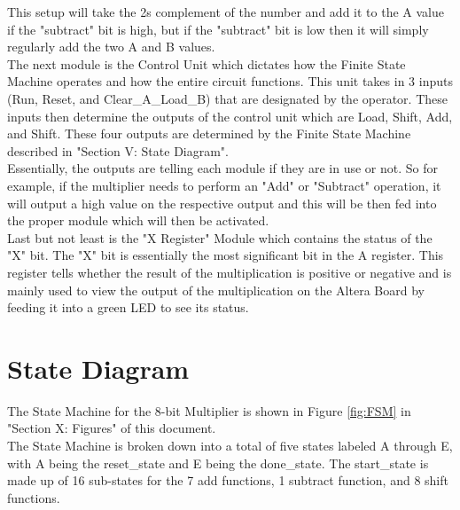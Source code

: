 \documentclass[journal, twocolumn, final,11pt,letterpaper]{IEEEtran}
\begin{document}
This setup will take the 2s complement of the number and add it to the A value if the "subtract" bit is high, but if the "subtract" bit is low then it will simply regularly add the two A and B values. \\

The next module is the Control Unit which dictates how the Finite State Machine operates and how the entire circuit functions. This unit takes in 3 inputs (Run, Reset, and Clear\_A\_Load\_B) that are designated by the operator. These inputs then determine the outputs of the control unit which are Load, Shift, Add, and Shift. These four outputs are determined by the Finite State Machine described in "Section V: State Diagram".\\

 Essentially, the outputs are telling each module if they are in use or not. So for example, if the multiplier needs to perform an "Add" or "Subtract" operation, it will output a high value on the respective output and this will be then fed into the proper module which will then be activated. \\

Last but not least is the "X Register" Module which contains the status of the "X" bit. The "X" bit is essentially the most significant bit in the A register. This register tells whether the result of the multiplication is positive or negative and is mainly used to view the output of the multiplication on the Altera Board by feeding it into a green LED to see its status. 

\section{State Diagram}
The State Machine for the 8-bit Multiplier is shown in Figure \ref{fig:FSM} in "Section X: Figures" of this document.  \\

The State Machine is broken down into a total of five states labeled A through E, with A being the reset\_state and E being the done\_state. The start\_state is made up of 16 sub-states for the 7 add functions, 1 subtract function, and 8 shift functions.  

\end{document}
